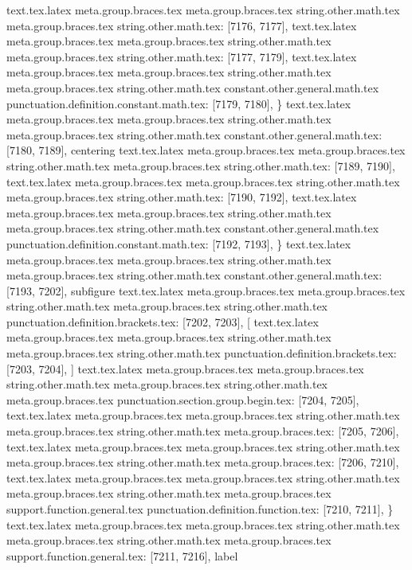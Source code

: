 {{{{{{{{{{{{{{{{{{{{{{{{{{{{{{{{{{{{{{{{{{{{{{{{{{{{{{{{{{{{{{{{{{{{{{{{{{{{{{{{{{{{{{{{{{{{{{{{{{{{{{{{{{{{{{{{{{{{{{{{{{{{{{{{{{{{{{{{{{{{{{{{{{{{{{{{{{{{{{{{{{{{{{{{{{{{{{{{{{{{{{{{{{{text.tex.latex meta.group.braces.tex meta.group.braces.tex string.other.math.tex meta.group.braces.tex string.other.math.tex: [7176, 7177], {
}
text.tex.latex meta.group.braces.tex meta.group.braces.tex string.other.math.tex meta.group.braces.tex string.other.math.tex: [7177, 7179], {  }
text.tex.latex meta.group.braces.tex meta.group.braces.tex string.other.math.tex meta.group.braces.tex string.other.math.tex constant.other.general.math.tex punctuation.definition.constant.math.tex: [7179, 7180], {\}
text.tex.latex meta.group.braces.tex meta.group.braces.tex string.other.math.tex meta.group.braces.tex string.other.math.tex constant.other.general.math.tex: [7180, 7189], {centering}
text.tex.latex meta.group.braces.tex meta.group.braces.tex string.other.math.tex meta.group.braces.tex string.other.math.tex: [7189, 7190], {
}
text.tex.latex meta.group.braces.tex meta.group.braces.tex string.other.math.tex meta.group.braces.tex string.other.math.tex: [7190, 7192], {  }
text.tex.latex meta.group.braces.tex meta.group.braces.tex string.other.math.tex meta.group.braces.tex string.other.math.tex constant.other.general.math.tex punctuation.definition.constant.math.tex: [7192, 7193], {\}
text.tex.latex meta.group.braces.tex meta.group.braces.tex string.other.math.tex meta.group.braces.tex string.other.math.tex constant.other.general.math.tex: [7193, 7202], {subfigure}
text.tex.latex meta.group.braces.tex meta.group.braces.tex string.other.math.tex meta.group.braces.tex string.other.math.tex punctuation.definition.brackets.tex: [7202, 7203], {[}
text.tex.latex meta.group.braces.tex meta.group.braces.tex string.other.math.tex meta.group.braces.tex string.other.math.tex punctuation.definition.brackets.tex: [7203, 7204], {]}
text.tex.latex meta.group.braces.tex meta.group.braces.tex string.other.math.tex meta.group.braces.tex string.other.math.tex meta.group.braces.tex punctuation.section.group.begin.tex: [7204, 7205], {{}
text.tex.latex meta.group.braces.tex meta.group.braces.tex string.other.math.tex meta.group.braces.tex string.other.math.tex meta.group.braces.tex: [7205, 7206], {
}
text.tex.latex meta.group.braces.tex meta.group.braces.tex string.other.math.tex meta.group.braces.tex string.other.math.tex meta.group.braces.tex: [7206, 7210], {    }
text.tex.latex meta.group.braces.tex meta.group.braces.tex string.other.math.tex meta.group.braces.tex string.other.math.tex meta.group.braces.tex support.function.general.tex punctuation.definition.function.tex: [7210, 7211], {\}
text.tex.latex meta.group.braces.tex meta.group.braces.tex string.other.math.tex meta.group.braces.tex string.other.math.tex meta.group.braces.tex support.function.general.tex: [7211, 7216], {label}
}}}}}}}}}}}}}}}}}}}}}}}}}}}}}}}}}}}}}}}}}}}}}}}}}}}}}}}}}}}}}}}}}}}}}}}}}}}}}}}}}}}}}}}}}}}}}}}}}}}}}}}}}}}}}}}}}}}}}}}}}}}}}}}}}}}}}}}}}}}}}}}}}}}}}}}}}}}}}}}}}}}}}}}}}}}}}}}}}}}}}}}}}}}}}}}
